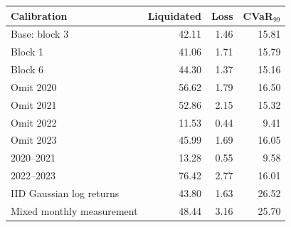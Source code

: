 \begin{tabular}{lrrr}
\toprule
Calibration & Liquidated & Loss & CVaR$_{99}$ \\
\midrule
Base: block 3 & 42.11 & 1.46 & 15.81 \\
Block 1 & 41.06 & 1.71 & 15.79 \\
Block 6 & 44.30 & 1.37 & 15.16 \\
Omit 2020 & 56.62 & 1.79 & 16.50 \\
Omit 2021 & 52.86 & 2.15 & 15.32 \\
Omit 2022 & 11.53 & 0.44 & 9.41 \\
Omit 2023 & 45.99 & 1.69 & 16.05 \\
2020--2021 & 13.28 & 0.55 & 9.58 \\
2022--2023 & 76.42 & 2.77 & 16.01 \\
IID Gaussian log returns & 43.80 & 1.63 & 26.52 \\
Mixed monthly measurement & 48.44 & 3.16 & 25.70 \\
\bottomrule
\end{tabular}
